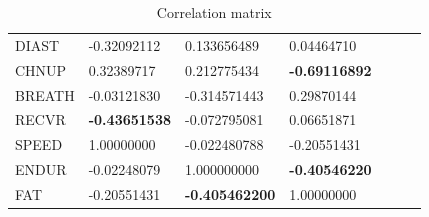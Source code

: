 \documentclass[10pt]{article}
\begin{document}
\begin{table}[H]
\begin{tabular}{lllllll}
DIAST  & -0.32092112           & 0.133656489           & 0.04464710           &                      &                     &                       \\
CHNUP  & 0.32389717            & 0.212775434           & \textbf{-0.69116892} &                      &                     &                       \\
BREATH & -0.03121830           & -0.314571443          & 0.29870144           &                      &                     &                       \\
RECVR  & \textbf{-0.43651538}  & -0.072795081          & 0.06651871           &                      &                     &                       \\
SPEED  & 1.00000000            & -0.022480788          & -0.20551431          &                      &                     &                       \\
ENDUR  & -0.02248079           & 1.000000000           & \textbf{-0.40546220} & \textbf{}            &                     &                       \\
FAT    & -0.20551431           & \textbf{-0.405462200} & 1.00000000           &                      &                     &
\end{tabular}
\caption{Correlation matrix}
\end{table}
\end{document}
